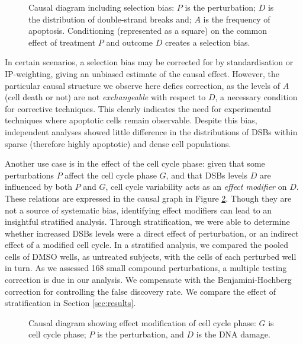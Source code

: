 \begin{figure}[b!]
\centering
{}
\caption{Causal diagram including selection bias: $P$ is the perturbation; $D$ is the distribution of double-strand breaks and; $A$ is the frequency of apoptosis. Conditioning (represented as a square) on the common effect of treatment $P$ and outcome $D$ creates a selection bias.}
\label{fig:bias}
\end{figure}

In certain scenarios, a selection bias may be corrected for by standardisation or IP-weighting, giving an unbiased estimate of the causal effect. However, the particular causal structure we observe here defies correction, as the levels of $A$ (cell death or not) are not \emph{exchangeable} with respect to $D$, a necessary condition for corrective techniques. This clearly indicates the need for experimental techniques where apoptotic cells remain observable. Despite this bias, independent analyses showed little difference in the distributions of DSBs within sparse (therefore highly apoptotic) and dense cell populations.

Another use case is in the effect of the cell cycle phase: given that some perturbations $P$ affect the cell cycle phase $G$, and that DSBs levels $D$ are influenced by both $P$ and $G$, cell cycle variability acts as an \emph{effect modifier} on $D$. These relations are expressed in the causal graph in Figure \ref{fig:effectmodification}. Though they are not a source of systematic bias, identifying effect modifiers can lead to an insightful stratified analysis. Through stratification, we were able to determine whether increased DSBs levels were a direct effect of perturbation, or an indirect effect of a modified cell cycle. In a stratified analysis, we compared the pooled cells of DMSO wells, as untreated subjects, with the cells of each perturbed well in turn. As we assessed 168 small compound perturbations, a multiple testing correction is due in our analysis. We compensate with the Benjamini-Hochberg correction for controlling the false discovery rate. We compare the effect of stratification in Section \ref{sec:results}.

\begin{figure}
\centering
{}
\caption{Causal diagram showing effect modification of cell cycle phase: $G$ is cell cycle phase; $P$ is the perturbation, and $D$ is the DNA damage.} 
\label{fig:effectmodification}
\end{figure}

